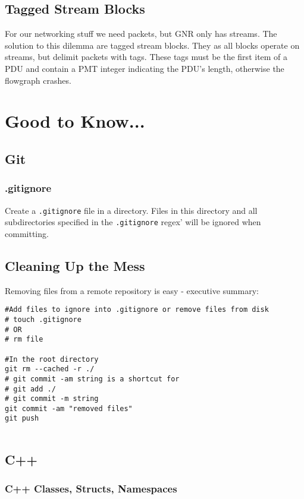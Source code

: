 \documentclass{article}
\begin{document}
\subsection{Tagged Stream Blocks}

For our networking stuff we need packets, but GNR only has streams. The solution to this dilemma are tagged stream blocks. They as all blocks operate on streams, but delimit packets with tags. These tags must be the first item of a PDU and contain a PMT integer indicating the PDU's length, otherwise the flowgraph crashes.

\section{Good to Know...}

\subsection{Git}

\subsubsection{.gitignore}

Create a \texttt{.gitignore} file in a directory. Files in this directory and all subdirectories specified in the \texttt{.gitignore} regex' will be ignored when committing.

\subsection{Cleaning Up the Mess}

Removing files from a remote repository is easy - executive summary:

\begin{verbatim}
#Add files to ignore into .gitignore or remove files from disk
# touch .gitignore
# OR
# rm file

#In the root directory
git rm --cached -r ./
# git commit -am string is a shortcut for
# git add ./
# git commit -m string
git commit -am "removed files"
git push
 
\end{verbatim}

\subsection{C++}

\subsubsection{C++ Classes, Structs, Namespaces}
\end{document}

